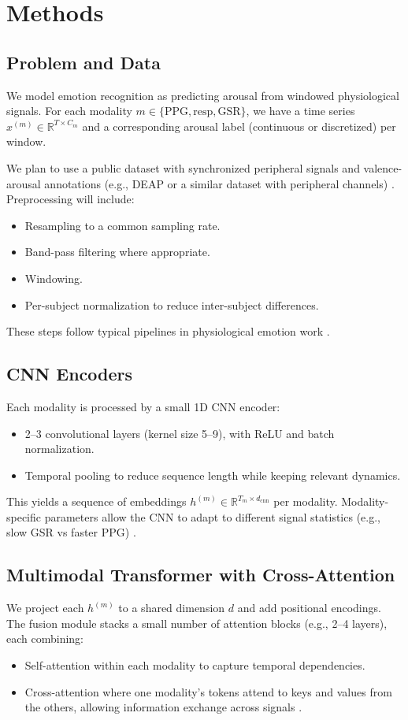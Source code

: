 \documentclass[11pt]{article}
\begin{document}
\section{Methods}
\subsection{Problem and Data}
We model emotion recognition as predicting arousal from windowed physiological signals. For each modality $m \in \{\mathrm{PPG}, \mathrm{resp}, \mathrm{GSR}\}$, we have a time series $x^{(m)} \in \mathbb{R}^{T \times C_m}$ and a corresponding arousal label (continuous or discretized) per window.

We plan to use a public dataset with synchronized peripheral signals and valence-arousal annotations (e.g., DEAP or a similar dataset with peripheral channels) \cite{noauthor_datasets_nodate}. Preprocessing will include:
\begin{itemize}[leftmargin=1.4em]
  \item Resampling to a common sampling rate.
  \item Band-pass filtering where appropriate.
  \item Windowing.
  \item Per-subject normalization to reduce inter-subject differences.
\end{itemize}
These steps follow typical pipelines in physiological emotion work \cite{kacimi_comprehensive_2025,siddiqui_respiration_2021}.

\subsection{CNN Encoders}
Each modality is processed by a small 1D CNN encoder:
\begin{itemize}[leftmargin=1.4em]
  \item 2--3 convolutional layers (kernel size 5--9), with ReLU and batch normalization.
  \item Temporal pooling to reduce sequence length while keeping relevant dynamics.
\end{itemize}
This yields a sequence of embeddings $h^{(m)} \in \mathbb{R}^{T_m \times d_{\mathrm{cnn}}}$ per modality. Modality-specific parameters allow the CNN to adapt to different signal statistics (e.g., slow GSR vs faster PPG) \cite{kacimi_comprehensive_2025}.

\subsection{Multimodal Transformer with Cross-Attention}
We project each $h^{(m)}$ to a shared dimension $d$ and add positional encodings. The fusion module stacks a small number of attention blocks (e.g., 2--4 layers), each combining:
\begin{itemize}[leftmargin=1.4em]
  \item Self-attention within each modality to capture temporal dependencies.
  \item Cross-attention where one modality's tokens attend to keys and values from the others, allowing information exchange across signals \cite{ahire_maven_2025,ahire_maven_nodate}.
\end{itemize}
\end{document}
